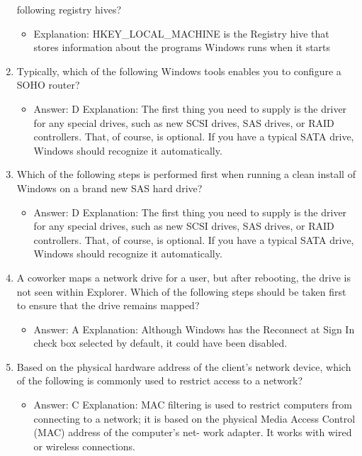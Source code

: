 \documentclass{article}
\begin{document}
\begin{enumerate}
following registry hives?
    \begin{itemize}
        \item Explanation: HKEY\_LOCAL\_MACHINE is the Registry hive that stores information
about the programs Windows runs when it starts
    \end{itemize}
    \item Typically, which of the following Windows tools enables you to
configure a SOHO router?
    \begin{itemize}
        \item Answer: D
Explanation: The first thing you need to supply is the driver for any special drives,
such as new SCSI drives, SAS drives, or RAID controllers. That, of course, is optional.
If you have a typical SATA drive, Windows should recognize it automatically.
    \end{itemize}
    \item Which of the following steps is performed first when running a
clean install of Windows on a brand new SAS hard drive?
    \begin{itemize}
        \item Answer: D
Explanation: The first thing you need to supply is the driver for any special drives,
such as new SCSI drives, SAS drives, or RAID controllers. That, of course, is optional.
If you have a typical SATA drive, Windows should recognize it automatically.
    \end{itemize}
    \item A coworker maps a network drive for a user, but after rebooting,
the drive is not seen within Explorer. Which of the following steps
should be taken first to ensure that the drive remains mapped?
    \begin{itemize}
        \item Answer: A
Explanation: Although Windows has the Reconnect at Sign In check box selected by
default, it could have been disabled.
    \end{itemize}
    \item Based on the physical hardware address of the client’s network
device, which of the following is commonly used to restrict access
to a network?
    \begin{itemize}
        \item Answer: C
Explanation: MAC filtering is used to restrict computers from connecting to a network;
it is based on the physical Media Access Control (MAC) address of the computer’s net-
work adapter. It works with wired or wireless connections.
    \end{itemize}

\end{enumerate}
\end{document}
